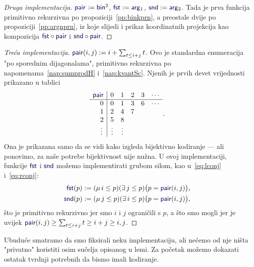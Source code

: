 \begin{proof}[Druga implementacija] $\f{pair}:=\f{bin}^2$, $\f{fst}:=\f{arg}_1$, $\f{snd}:=\f{arg}_2$. Tada je prva funkcija primitivno rekurzivna po propoziciji~\ref{pp:binkprn}, a preostale dvije po propoziciji~\ref{pp:argnprn}, iz koje slijedi i prikaz koordinatnih projekcija kao kompozicija $\f{fst}\circ\f{pair}$ i $\f{snd}\circ\f{pair}$.
\end{proof}

\begin{proof}[Treća implementacija] $\f{pair}(i,j):=i+\sum_{t\le i+j}t$. Ovo je standardna enumeracija "po sporednim dijagonalama", primitivno rekurzivna po napomenama~\ref{nap:sumprodH} i~\ref{nap:kvantSc}. Njenih je prvih devet vrijednosti prikazano u tablici \begin{equation}
\begin{array}{r|ccccc}
\f{pair}&0&1&2&3&\cdots\\\hline
0&0&1&3&6&\cdots\\
1&2&4&7\\
2&5&8\\
\vdots\,&\vdots&\vdots\\
\end{array}\text.
\end{equation}
Ona je prikazana samo da se vidi kako izgleda bijektivno kodiranje --- ali ponovimo, za naše potrebe bijektivnost nije nužna. U ovoj implementaciji, funkcije $\f{fst}$ i $\f{snd}$ možemo implementirati grubom silom, kao u~\eqref{eq:lconj} i~\eqref{eq:rconj}:
\begin{align}
    \f{fst}(p)&:=(\mu\,i\le p)(\exists\,j\le p)\bigl(p=\f{pair}(i,j)\bigr)\text,\\
    \f{snd}(p)&:=(\mu\,j\le p)(\exists\,i\le p)\bigl(p=\f{pair}(i,j)\bigr)\text,
\end{align}
što je primitivno rekurzivno jer smo $i$ i $j$ ograničili s $p$, a što smo mogli jer je uvijek $\f{pair}(i,j)\ge\sum_{t\le i+j}t\ge i+j\ge i,j$.
\end{proof}

Ubuduće smatramo da smo fiksirali neku implementaciju, ali nećemo od nje ništa "privatno" koristiti osim sučelja opisanog u lemi. Za početak možemo dokazati ostatak tvrdnji potrebnih da bismo imali kodiranje.

